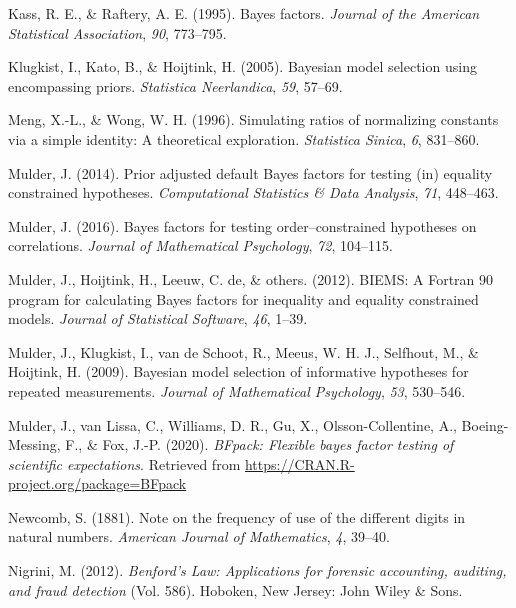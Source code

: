 \documentclass[
  english,
  man,floatsintext]{apa6}
\newlength{\cslhangindent}
\newenvironment{cslreferences}%
  {\setlength{\parindent}{0pt}%
  \everypar{\setlength{\hangindent}{\cslhangindent}}\ignorespaces}%
  {\par}
\begin{document}
\begin{cslreferences}
\leavevmode\hypertarget{ref-kass1995bayes}{}%
Kass, R. E., \& Raftery, A. E. (1995). Bayes factors. \emph{Journal of the American Statistical Association}, \emph{90}, 773--795.

\leavevmode\hypertarget{ref-klugkist2005bayesian}{}%
Klugkist, I., Kato, B., \& Hoijtink, H. (2005). Bayesian model selection using encompassing priors. \emph{Statistica Neerlandica}, \emph{59}, 57--69.

\leavevmode\hypertarget{ref-meng1996simulating}{}%
Meng, X.-L., \& Wong, W. H. (1996). Simulating ratios of normalizing constants via a simple identity: A theoretical exploration. \emph{Statistica Sinica}, \emph{6}, 831--860.

\leavevmode\hypertarget{ref-mulder2014prior}{}%
Mulder, J. (2014). Prior adjusted default Bayes factors for testing (in) equality constrained hypotheses. \emph{Computational Statistics \& Data Analysis}, \emph{71}, 448--463.

\leavevmode\hypertarget{ref-mulder2016bayes}{}%
Mulder, J. (2016). Bayes factors for testing order--constrained hypotheses on correlations. \emph{Journal of Mathematical Psychology}, \emph{72}, 104--115.

\leavevmode\hypertarget{ref-mulder2012biems}{}%
Mulder, J., Hoijtink, H., Leeuw, C. de, \& others. (2012). BIEMS: A Fortran 90 program for calculating Bayes factors for inequality and equality constrained models. \emph{Journal of Statistical Software}, \emph{46}, 1--39.

\leavevmode\hypertarget{ref-mulder2009bayesian}{}%
Mulder, J., Klugkist, I., van de Schoot, R., Meeus, W. H. J., Selfhout, M., \& Hoijtink, H. (2009). Bayesian model selection of informative hypotheses for repeated measurements. \emph{Journal of Mathematical Psychology}, \emph{53}, 530--546.

\leavevmode\hypertarget{ref-bfpack}{}%
Mulder, J., van Lissa, C., Williams, D. R., Gu, X., Olsson-Collentine, A., Boeing-Messing, F., \& Fox, J.-P. (2020). \emph{BFpack: Flexible bayes factor testing of scientific expectations}. Retrieved from \url{https://CRAN.R-project.org/package=BFpack}

\leavevmode\hypertarget{ref-newcomb1881note}{}%
Newcomb, S. (1881). Note on the frequency of use of the different digits in natural numbers. \emph{American Journal of Mathematics}, \emph{4}, 39--40.

\leavevmode\hypertarget{ref-nigrini2012benford}{}%
Nigrini, M. (2012). \emph{Benford's Law: Applications for forensic accounting, auditing, and fraud detection} (Vol. 586). Hoboken, New Jersey: John Wiley \& Sons.


\end{cslreferences}
\end{document}
